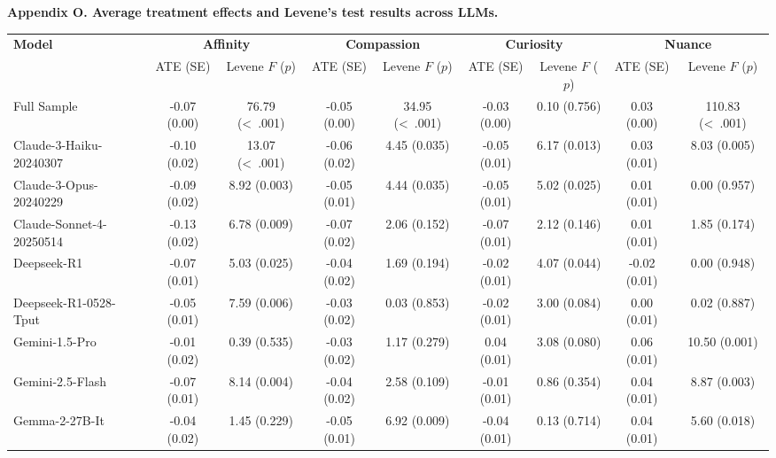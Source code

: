 \documentclass[11pt]{article}
\begin{document}
\begin{landscape}
\noindent\textbf{Appendix O. Average treatment effects and Levene’s test results across LLMs.}

\vspace{1em}
{\small
\renewcommand{\arraystretch}{1.2}
\begin{tabular}{l c c c c c c c c}
\toprule
\textbf{Model} & \multicolumn{2}{c}{\textbf{Affinity}} & \multicolumn{2}{c}{\textbf{Compassion}} & \multicolumn{2}{c}{\textbf{Curiosity}} & \multicolumn{2}{c}{\textbf{Nuance}} \\
 & ATE (SE) & Levene $F$ ($p$) & ATE (SE) & Levene $F$ ($p$) & ATE (SE) & Levene $F$ ($p$) & ATE (SE) & Levene $F$ ($p$) \\
\midrule
Full Sample & -0.07 (0.00) & 76.79 (\textless\ .001) & -0.05 (0.00) & 34.95 (\textless\ .001) & -0.03 (0.00) & 0.10 (0.756) & 0.03 (0.00) & 110.83 (\textless\ .001) \\
\addlinespace[0.5em]
Claude-3-Haiku-20240307 & -0.10 (0.02) & 13.07 (\textless\ .001) & -0.06 (0.02) & 4.45 (0.035) & -0.05 (0.01) & 6.17 (0.013) & 0.03 (0.01) & 8.03 (0.005) \\
\addlinespace[0.5em]
Claude-3-Opus-20240229 & -0.09 (0.02) & 8.92 (0.003) & -0.05 (0.01) & 4.44 (0.035) & -0.05 (0.01) & 5.02 (0.025) & 0.01 (0.01) & 0.00 (0.957) \\
\addlinespace[0.5em]
Claude-Sonnet-4-20250514 & -0.13 (0.02) & 6.78 (0.009) & -0.07 (0.02) & 2.06 (0.152) & -0.07 (0.01) & 2.12 (0.146) & 0.01 (0.01) & 1.85 (0.174) \\
\addlinespace[0.5em]
Deepseek-R1 & -0.07 (0.01) & 5.03 (0.025) & -0.04 (0.02) & 1.69 (0.194) & -0.02 (0.01) & 4.07 (0.044) & -0.02 (0.01) & 0.00 (0.948) \\
\addlinespace[0.5em]
Deepseek-R1-0528-Tput & -0.05 (0.01) & 7.59 (0.006) & -0.03 (0.02) & 0.03 (0.853) & -0.02 (0.01) & 3.00 (0.084) & 0.00 (0.01) & 0.02 (0.887) \\
\addlinespace[0.5em]
Gemini-1.5-Pro & -0.01 (0.02) & 0.39 (0.535) & -0.03 (0.02) & 1.17 (0.279) & 0.04 (0.01) & 3.08 (0.080) & 0.06 (0.01) & 10.50 (0.001) \\
\addlinespace[0.5em]
Gemini-2.5-Flash & -0.07 (0.01) & 8.14 (0.004) & -0.04 (0.02) & 2.58 (0.109) & -0.01 (0.01) & 0.86 (0.354) & 0.04 (0.01) & 8.87 (0.003) \\
\addlinespace[0.5em]
Gemma-2-27B-It & -0.04 (0.02) & 1.45 (0.229) & -0.05 (0.01) & 6.92 (0.009) & -0.04 (0.01) & 0.13 (0.714) & 0.04 (0.01) & 5.60 (0.018) \\

\end{tabular}}
\end{landscape}
\end{document}
